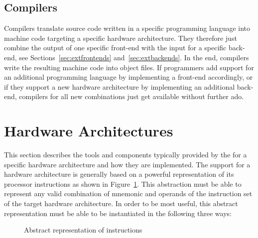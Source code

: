 \subsection{Compilers}

Compilers translate source code written in a specific programming language into machine code targeting a specific hardware architecture.
They therefore just combine the output of one specific front-end with the input for a specific back-end, see Sections~\ref{sec:extfrontends} and~\ref{sec:extbackends}.
In the end, compilers write the resulting machine code into object files.
\seeobject
If programmers add support for an additional programming language by implementing a front-end accordingly,
or if they support a new hardware architecture by implementing an additional back-end, compilers for all new combinations just get available without further ado.

\section{Hardware Architectures}

This section describes the tools and components typically provided by the \ecs{} for a specific hardware architecture and how they are implemented.
The support for a hardware architecture is generally based on a powerful representation of its processor instructions as shown in Figure~\ref{fig:extinstructions}.
This abstraction must be able to represent any valid combination of mnemonic and operands of the instruction set of the target hardware architecture.
In order to be most useful, this abstract representation must be able to be instantiated in the following three ways:

\begin{figure}
\caption{Abstract representation of instructions}
\label{fig:extinstructions}
\end{figure}

